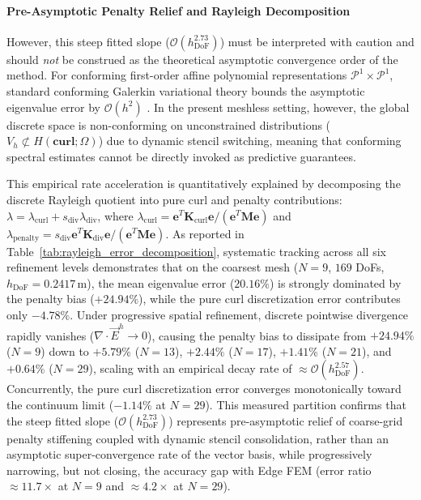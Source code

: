 \documentclass[preprint,12pt]{elsarticle}
\begin{document}
\paragraph{Pre-Asymptotic Penalty Relief and Rayleigh Decomposition}
However, this steep fitted slope ($\mathcal{O}(h_{\mathrm{DoF}}^{2.73})$) must be interpreted with caution and should \emph{not} be construed as the theoretical asymptotic convergence order of the method. For conforming first-order affine polynomial representations $\mathcal{P}^1 \times \mathcal{P}^1$, standard conforming Galerkin variational theory bounds the asymptotic eigenvalue error by $\mathcal{O}(h^2)$ \cite{monk2003finite, boffi1999computational, boffi2013mixed}. In the present meshless setting, however, the global discrete space is non-conforming on unconstrained distributions ($V_h \not\subset H(\mathbf{curl};\Omega)$) due to dynamic stencil switching, meaning that conforming spectral estimates cannot be directly invoked as predictive guarantees.

This empirical rate acceleration is quantitatively explained by decomposing the discrete Rayleigh quotient into pure curl and penalty contributions: $\lambda = \lambda_{\mathrm{curl}} + s_{\mathrm{div}} \lambda_{\mathrm{div}}$, where $\lambda_{\mathrm{curl}} = \mathbf{e}^T \mathbf{K}_{\mathrm{curl}} \mathbf{e} / (\mathbf{e}^T \mathbf{M} \mathbf{e})$ and $\lambda_{\mathrm{penalty}} = s_{\mathrm{div}} \mathbf{e}^T \mathbf{K}_{\mathrm{div}} \mathbf{e} / (\mathbf{e}^T \mathbf{M} \mathbf{e})$. As reported in Table~\ref{tab:rayleigh_error_decomposition}, systematic tracking across all six refinement levels demonstrates that on the coarsest mesh ($N=9$, $169$ DoFs, $h_{\mathrm{DoF}} = 0.2417$\,m), the mean eigenvalue error ($20.16\%$) is strongly dominated by the penalty bias ($+24.94\%$), while the pure curl discretization error contributes only $-4.78\%$. Under progressive spatial refinement, discrete pointwise divergence rapidly vanishes ($\nabla \cdot \vec{E}^h \to 0$), causing the penalty bias to dissipate from $+24.94\%$ ($N=9$) down to $+5.79\%$ ($N=13$), $+2.44\%$ ($N=17$), $+1.41\%$ ($N=21$), and $+0.64\%$ ($N=29$), scaling with an empirical decay rate of $\approx \mathcal{O}(h_{\mathrm{DoF}}^{2.57})$. Concurrently, the pure curl discretization error converges monotonically toward the continuum limit ($-1.14\%$ at $N=29$). This measured partition confirms that the steep fitted slope ($\mathcal{O}(h_{\mathrm{DoF}}^{2.73})$) represents pre-asymptotic relief of coarse-grid penalty stiffening coupled with dynamic stencil consolidation, rather than an asymptotic super-convergence rate of the vector basis, while progressively narrowing, but not closing, the accuracy gap with Edge FEM (error ratio $\approx 11.7\times$ at $N=9$ and $\approx 4.2\times$ at $N=29$).
\end{document}
